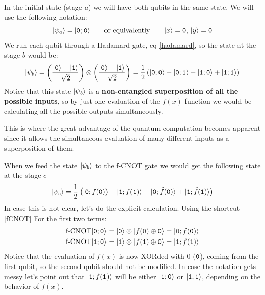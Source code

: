 In the initial state (stage $a$) we will have both qubits in the same state. We will use the following notation:
\begin{equation}
  |\psi_{a}\rangle = |\texttt{0};\texttt{0}\rangle \qquad\text{or equivalently}\qquad
  |x\rangle=\texttt{0}\text{, }|y\rangle=\texttt{0}
\end{equation}
We run each qubit through a Hadamard gate, eq \eqref{hadamard}, so the state at the stage $b$ would be:
\begin{equation}
  |\psi_{b}\rangle =
  \left(\frac{|\texttt{0}\rangle-|\texttt{1}\rangle}{\sqrt{2}}\right)\otimes
  \left(\frac{|\texttt{0}\rangle-|\texttt{1}\rangle}{\sqrt{2}}\right) =
  \frac{1}{2}\left(|\texttt{0};\texttt{0}\rangle-|\texttt{0};\texttt{1}\rangle-
  |\texttt{1};\texttt{0}\rangle+|\texttt{1};\texttt{1}\rangle\right)
\end{equation}
Notice that this state $|\psi_b\rangle$ is a \textbf{non-entangled superposition of all the possible inputs}, so by just one evaluation of the $f(x)$ function we would be calculating all the possible outputs simultaneously.

This is where the great advantage of the quantum computation becomes apparent since it allows the simultaneous evaluation of many different inputs as a superposition of them.

When we feed the state $|\psi_b\rangle$ to the f-CNOT gate we would get the following state at the stage $c$
\begin{equation}
  |\psi_{c}\rangle = \frac{1}{2}
  \left(|\texttt{0};f(\texttt{0})\rangle - |\texttt{1};f(\texttt{1})\rangle - |\texttt{0};\tilde{f}(\texttt{0})\rangle+
  |\texttt{1};\tilde{f}(\texttt{1})\rangle \right)
\end{equation}
In case this is not clear, let's do the explicit calculation. Using the shortcut \eqref{fCNOT}
For the first two terms:
\begin{equation}
  \begin{split}
    \text{f-CNOT}|\texttt{0};\texttt{0}\rangle &=
    |\texttt{0}\rangle\otimes|f(\texttt{0})\oplus\texttt{0}\rangle =|\texttt{0};f(\texttt{0})\rangle\\
    \text{f-CNOT}|\texttt{1};\texttt{0}\rangle &=
    |\texttt{1}\rangle\otimes|f(\texttt{1})\oplus \texttt{0}\rangle = |\texttt{1};f(\texttt{1})\rangle
  \end{split}
\end{equation}
Notice that the evaluation of $f(x)$ is now XORded with 0 ($\texttt{0}$), coming from the first qubit, so the second qubit should not be modified.
In case the notation gets messy let's point out that $|\texttt{1};f(\texttt{1})\rangle$ will be either $|\texttt{1};\texttt{0}\rangle$ or $|\texttt{1};\texttt{1}\rangle$, depending on the behavior of $f(x)$.

